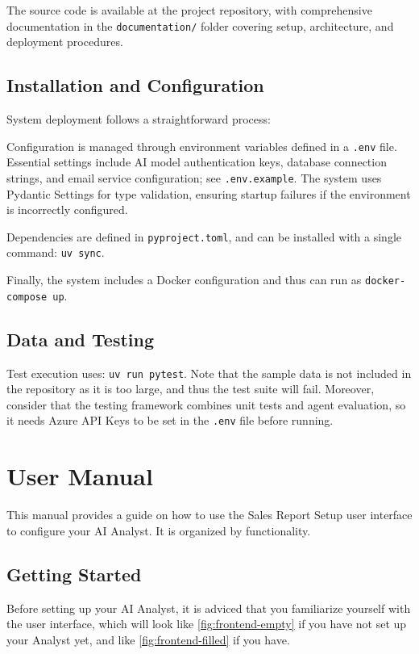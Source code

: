 \documentclass[a4paper]{report}
\begin{document}
The source code is available at the project repository, with comprehensive documentation in the \texttt{documentation/} folder covering setup, architecture, and deployment procedures.

\section{Installation and Configuration}

System deployment follows a straightforward process:

Configuration is managed through environment variables defined in a \texttt{.env} file. Essential settings include AI model authentication keys, database connection strings, and email service configuration; see \texttt{.env.example}. The system uses Pydantic Settings for type validation, ensuring startup failures if the environment is incorrectly configured.

Dependencies are defined in \texttt{pyproject.toml}, and can be installed with a single command: \texttt{uv sync}.

Finally, the system includes a Docker configuration and thus can run as
\texttt{docker-compose up}.

\section{Data and Testing}

Test execution uses: \texttt{uv run pytest}. Note that the sample data is not included in the repository as it is too large, and thus the test suite will fail. Moreover, consider that the testing framework combines unit tests and agent evaluation, so it needs Azure API Keys to be set in the \texttt{.env} file before running.

\chapter{User Manual}
\label{annex:user-manual}

This manual provides a guide on how to use the Sales Report Setup user interface to configure your AI Analyst. It is organized by functionality.

\section{Getting Started}

Before setting up your AI Analyst, it is adviced that you familiarize yourself with the user interface, which will look like \autoref{fig:frontend-empty} if you have not set up your Analyst yet, and like \autoref{fig:frontend-filled} if you have.
\end{document}
